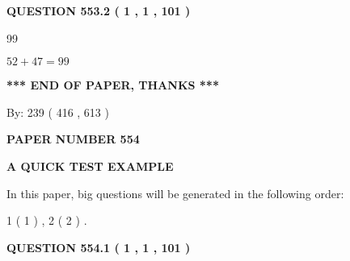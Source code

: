 \documentclass[12pt]{article}
\begin{document}
{\textbf{\Large{QUESTION
553.2 
 ( 1 , 1 , 101 )
}}}
  
  
 
 
\noindent{}

99
 
 
 
 
\noindent{}

$ %
52 +  %
47=   %
99$
 
 
   
   
 \vspace{0.2in}
 
   
   
   
   
\vspace{1.0in} 
{\textbf{\large{ *** END OF PAPER, THANKS *** }}} 
   
   
\hspace{1.0in} By: 
 239 ( 416 ,  613 )
   
   
   
   
\newpage 
\setcounter{page}{ 
   554001 } 
   
   
   
   
 {\textbf{ \Large{ PAPER NUMBER  554  }}}
   
   
\vspace{0.2in}
   
   
   
   
   
   
 \vspace{0.2in}
{\LARGE {\textbf{ A QUICK TEST EXAMPLE}}}
   
   
   
\vspace{0.2in}
   
In this paper, big questions will be generated in the following order: 
   
   
   1 ( 1 )
 ,
   2 ( 2 )
 .
  
\vspace{0.2in}
  
{\textbf{\Large{QUESTION
554.1 
 ( 1 , 1 , 101 )
}}}
  
  
 
 
\noindent{}
\end{document}
